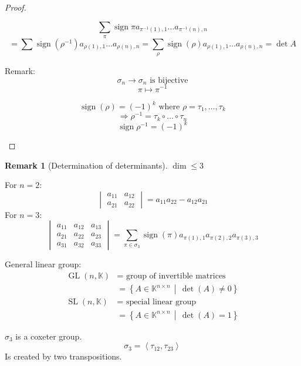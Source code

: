 \documentclass[a4paper,landscape,twocolumn]{article}
\newcommand\setdef[2]{\left\{#1\,\middle|\,#2\right\}}
\newcommand\functional[1]{\left\langle{#1}\right\rangle}
\theoremstyle{definition}
\newtheorem{rem}{Remark}
\DeclareMathOperator\sign{sign}
\begin{document}
\begin{proof}
\begin{enumerate}
      \[ \sum_{\pi} \sign{\pi} a_{\pi^{-1}(1),1} \ldots a_{\pi^{-1}(n),n} \]
      \[
        = \sum \sign(\rho^{-1}) a_{\rho(1),1} \ldots a_{\rho(n),n}
        = \sum_{\rho} \sign(\rho) a_{\rho(1),1} \ldots a_{\rho(n),n}
        = \det{A}
      \]

      Remark:
      \[ \sigma_n \to \sigma_n \text{ is bijective} \]
      \[ \pi \mapsto \pi^{-1} \]

      \[ \sign(\rho) = (-1)^k \text{ where } \rho = \tau_1, \ldots, \tau_k \]
      \[ \Rightarrow \rho^{-1} = \tau_k \circ \ldots \circ \tau_n \]
      \[ \sign{\rho^{-1}} = (-1)^k \]
  \end{enumerate}
\end{proof}

\begin{rem}[Determination of determinants]
  \label{rem-7.31}
  $\dim \leq 3$

  For $n=2$:
  \[ \begin{vmatrix} a_{11} & a_{12} \\ a_{21} & a_{22} \end{vmatrix} = a_{11} a_{22} - a_{12} a_{21} \]
  For $n = 3$:
  \[
    \begin{vmatrix} a_{11} & a_{12} & a_{13} \\ a_{21} & a_{22} & a_{23} \\ a_{31} & a_{32} & a_{33} \end{vmatrix}
    = \sum_{\pi \in \sigma_3} \sign(\pi) a_{\pi(1),1} a_{\pi(2),2} a_{\pi(3),3}
  \]

  General linear group:
  \begin{align*}
    \operatorname{GL}(n,\mathbb K)
      &= \text{ group of invertible matrices} \\
      &= \setdef{A \in \mathbb K^{n \times n}}{\det(A) \neq 0} \\
    \operatorname{SL}(n, \mathbb K)
      &= \text{ special linear group} \\
      &= \setdef{A \in \mathbb K^{n \times n}}{\det(A) = 1}
  \end{align*}

  $\sigma_3$ is a coxeter group.
  \[ \sigma_3 = \functional{\tau_{12}, \tau_{23}} \]
  Is created by two transpositions.


\end{rem}
\end{document}
